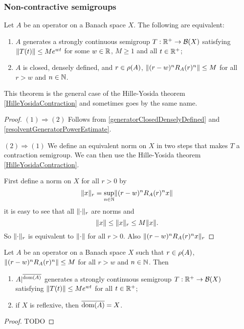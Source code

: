 \subsubsection{Non-contractive semigroups}
\begin{theorem}
Let $A$ be an operator on a Banach space $X$. The following are equivalent:
\begin{enumerate}
\item $A$ generates a strongly continuous semigroup $T: \mathbb{R}^+\to \operatorname{\mathcal{B}}(X)$ satisfying $\lVert T(t)\rVert\leq Me^{wt}$ for some $w\in \mathbb{R}$, $M\geq 1$ and all $t\in\mathbb{R}^+$;
\item $A$ is closed, densely defined, and $r\in \rho(A)$, $\lVert(r-w)^nR_A(r)^n\rVert \leq M$ for all $r>w$ and $n\in \mathbb{N}$.
\end{enumerate}
\end{theorem}
This theorem is the general case of the Hille-Yosida theorem \ref{HilleYosidaContraction} and sometimes goes by the same name.
\begin{proof}
$(1)\Rightarrow (2)$ Follows from \ref{generatorClosedDenselyDefined} and \ref{resolventGeneratorPowerEstimate}.

$(2) \Rightarrow (1)$ We define an equivalent norm on $X$ in two steps that makes $T$ a contraction semigroup. We can then use the Hille-Yosida theorem \ref{HilleYosidaContraction}.

First define a norm on $X$ for all $r>0$ by
\[ \lVert x\rVert_{r} = \sup_{n\in\mathbb{N}}\lVert(r-w)^nR_A(r)^nx\rVert \]
it is easy to see that all $\lVert\cdot\rVert_{r}$ are norms and
\[ \lVert x\rVert \leq \lVert x\rVert_r \leq M\lVert x\rVert. \]
So $\lVert\cdot\rVert_{r}$ is equivalent to $\lVert\cdot\rVert$ for all $r>0$. Also $\lVert(r-w)^nR_A(r)^nx\rVert_r$
\end{proof}
\begin{corollary}
Let $A$ be an operator on a Banach space $X$ such that $r\in \rho(A)$, $\lVert(r-w)^nR_A(r)^n\rVert \leq M$ for all $r>w$ and $n\in \mathbb{N}$. Then
\begin{enumerate}
\item $A|^{\overline{\operatorname{dom}(A)}}$ generates a strongly continuous semigroup $T: \mathbb{R}^+\to \operatorname{\mathcal{B}}(X)$ satisfying $\lVert T(t)\rVert\leq Me^{wt}$ for all $t\in\mathbb{R}^+$;
\item if $X$ is reflexive, then $\overline{\operatorname{dom}(A)} = X$.
\end{enumerate}
\end{corollary}
\begin{proof}
TODO
\end{proof}

